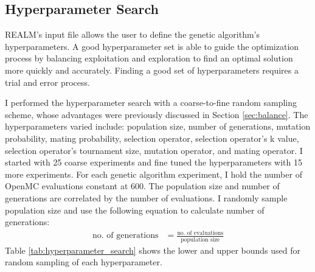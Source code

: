 \subsection{Hyperparameter Search}
REALM's input file allows the user to define the genetic algorithm's 
hyperparameters. 
A good hyperparameter set is able to guide the optimization process by 
balancing exploitation and exploration to find an optimal solution more quickly 
and accurately. 
Finding a good set of hyperparameters requires a trial and error process. 

I performed the hyperparameter search with a coarse-to-fine random sampling scheme, 
whose advantages were previously discussed in Section \ref{sec:balance}.
The hyperparameters varied include: population size, number of generations, 
mutation probability, mating probability, selection operator, selection operator's 
k value, selection operator's tournament size, mutation operator, and mating 
operator.  
I started with 25 coarse experiments and fine tuned the hyperparameters
with 15 more experiments. 
For each genetic algorithm experiment, I hold the number of OpenMC evaluations 
constant at 600.
The population size and number of generations are correlated by the number of 
evaluations. 
I randomly sample population size and use the following equation to calculate 
number of generations: 
\begin{align}
    \mbox{no. of generations} &= \frac{\mbox{no. of evaluations}}{\mbox{population size} }
\end{align}
Table \ref{tab:hyperparameter_search} shows the lower and upper bounds used 
for random sampling of each hyperparameter. 
